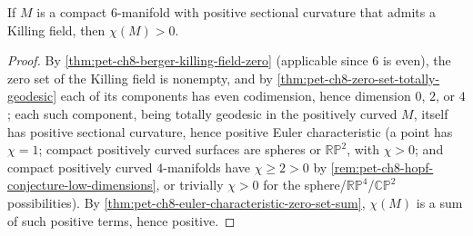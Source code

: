 \begin{corollary}[Corollary 8.3.3]
  \label{cor:pet-ch8-positive-euler-characteristic-6manifold}
  If $M$ is a compact $6$-manifold with positive sectional curvature that
  admits a Killing field, then $\chi(M)>0$.
\end{corollary}
\begin{proof}
  By \cref{thm:pet-ch8-berger-killing-field-zero} (applicable since $6$ is
  even), the zero set of the Killing field is nonempty, and by
  \cref{thm:pet-ch8-zero-set-totally-geodesic} each of its components has even
  codimension, hence dimension $0$, $2$, or $4$; each such component, being
  totally geodesic in the positively curved $M$, itself has positive sectional
  curvature, hence positive Euler characteristic (a point has $\chi=1$; compact
  positively curved surfaces are spheres or $\mathbb{RP}^2$, with $\chi>0$; and
  compact positively curved $4$-manifolds have $\chi\ge2>0$ by
  \cref{rem:pet-ch8-hopf-conjecture-low-dimensions}, or trivially $\chi>0$ for
  the sphere/$\mathbb{RP}^4$/$\mathbb{CP}^2$ possibilities). By
  \cref{thm:pet-ch8-euler-characteristic-zero-set-sum}, $\chi(M)$ is a sum of
  such positive terms, hence positive.
\end{proof}

